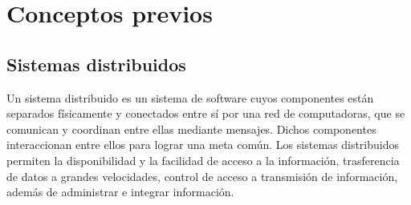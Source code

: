 \documentclass[11pt]{article}
\begin{document}
\begin{abstract}
		The SAT problem is chosen because of its complexity and number of ways to solve it. From
		so that, to solve a specific SAT problem, it is not necessary for the user to choose a
		specific algorithm, the system gives you an answer by selecting the resolution algorithm
		SAT more efficient. In addition to allowing any user to add new forms of
		solve SAT so that they compete with those already established. The viability of this system
		and his efficiency versus solving the problem directly using a solving algorithm
		general SAT (without being adapted to that instance of the problem) are analyzed. \\ \\
		
	\end{abstract}
	\section{Conceptos previos}
		\subsection{Sistemas distribuidos}
			Un sistema distribuido es un sistema de software cuyos componentes están separados físicamente y conectados entre sí por una red de computadoras, que 
			se comunican y coordinan entre ellas mediante mensajes. Dichos componentes interaccionan entre ellos para lograr una meta común.
			Los sistemas distribuidos permiten la disponibilidad y la facilidad de acceso a la información, trasferencia de datos a grandes velocidades, 
			control de acceso a transmisión de información, además de administrar e integrar información.
\end{document}
